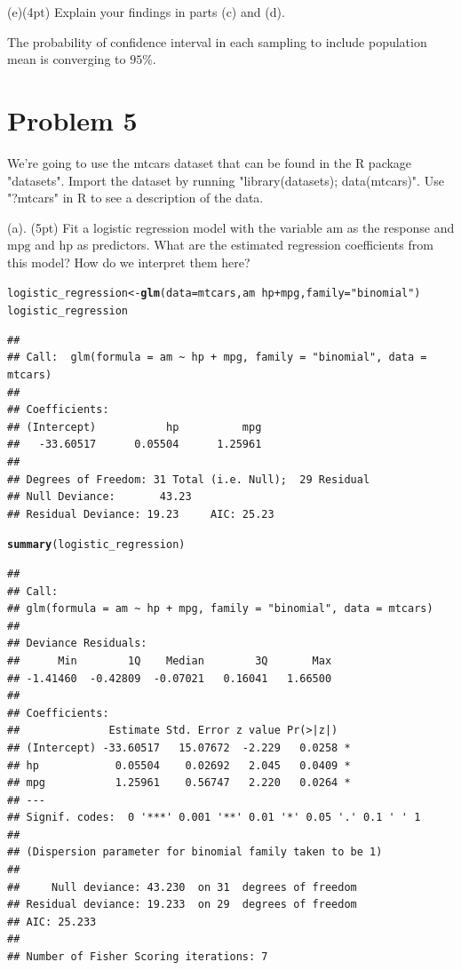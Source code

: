 \documentclass{article}\usepackage[]{graphicx}\usepackage[]{color}
\makeatletter
\newcommand{\hlstr}[1]{\textcolor[rgb]{0.192,0.494,0.8}{#1}}%
\newcommand{\hlopt}[1]{\textcolor[rgb]{0,0,0}{#1}}%
\newcommand{\hlstd}[1]{\textcolor[rgb]{0.345,0.345,0.345}{#1}}%
\newcommand{\hlkwb}[1]{\textcolor[rgb]{0.69,0.353,0.396}{#1}}%
\newcommand{\hlkwc}[1]{\textcolor[rgb]{0.333,0.667,0.333}{#1}}%
\newcommand{\hlkwd}[1]{\textcolor[rgb]{0.737,0.353,0.396}{\textbf{#1}}}%
\newenvironment{kframe}{%
 \def\at@end@of@kframe{}%
 \ifinner\ifhmode%
  \def\at@end@of@kframe{\end{minipage}}%
  \begin{minipage}{\columnwidth}%
 \fi\fi%
 \def\FrameCommand##1{\hskip\@totalleftmargin \hskip-\fboxsep
 \colorbox{shadecolor}{##1}\hskip-\fboxsep
     \hskip-\linewidth \hskip-\@totalleftmargin \hskip\columnwidth}%
 \MakeFramed {\advance\hsize-\width
   \@totalleftmargin\z@ \linewidth\hsize
   \@setminipage}}%
 {\par\unskip\endMakeFramed%
 \at@end@of@kframe}
\newenvironment{knitrout}{}{} %
\makeatother
\begin{document}
(e)(4pt) Explain your findings in parts (c) and (d).

\vspace*{0.5cm}
The probability of confidence interval in each sampling to include population mean is converging to $95\%$. 
\vspace*{0.5cm}


\section*{Problem 5}

We're going to use the mtcars dataset that can be found in the R package "datasets". Import the dataset by running "library(datasets); data(mtcars)". Use "?mtcars" in R to see a description of the data.

(a). (5pt) Fit a logistic regression model with the variable $\mathrm{am}$ as the response and $\mathrm{mpg}$ and $\mathrm{hp}$ as predictors. What are the estimated regression coefficients from this model? How do we interpret them here?

\begin{knitrout}
\color{fgcolor}\begin{kframe}
\begin{alltt}
\hlstd{logistic_regression} \hlkwb{<-} \hlkwd{glm}\hlstd{(}\hlkwc{data} \hlstd{= mtcars, am} \hlopt{~} \hlstd{hp} \hlopt{+} \hlstd{mpg,} \hlkwc{family} \hlstd{=} \hlstr{"binomial"}\hlstd{)}
\hlstd{logistic_regression}
\end{alltt}
\begin{verbatim}
## 
## Call:  glm(formula = am ~ hp + mpg, family = "binomial", data = mtcars)
## 
## Coefficients:
## (Intercept)           hp          mpg  
##   -33.60517      0.05504      1.25961  
## 
## Degrees of Freedom: 31 Total (i.e. Null);  29 Residual
## Null Deviance:	    43.23 
## Residual Deviance: 19.23 	AIC: 25.23
\end{verbatim}
\begin{alltt}
\hlkwd{summary}\hlstd{(logistic_regression)}
\end{alltt}
\begin{verbatim}
## 
## Call:
## glm(formula = am ~ hp + mpg, family = "binomial", data = mtcars)
## 
## Deviance Residuals: 
##      Min        1Q    Median        3Q       Max  
## -1.41460  -0.42809  -0.07021   0.16041   1.66500  
## 
## Coefficients:
##              Estimate Std. Error z value Pr(>|z|)  
## (Intercept) -33.60517   15.07672  -2.229   0.0258 *
## hp            0.05504    0.02692   2.045   0.0409 *
## mpg           1.25961    0.56747   2.220   0.0264 *
## ---
## Signif. codes:  0 '***' 0.001 '**' 0.01 '*' 0.05 '.' 0.1 ' ' 1
## 
## (Dispersion parameter for binomial family taken to be 1)
## 
##     Null deviance: 43.230  on 31  degrees of freedom
## Residual deviance: 19.233  on 29  degrees of freedom
## AIC: 25.233
## 
## Number of Fisher Scoring iterations: 7
\end{verbatim}
\end{kframe}
\end{knitrout}
\end{document}
